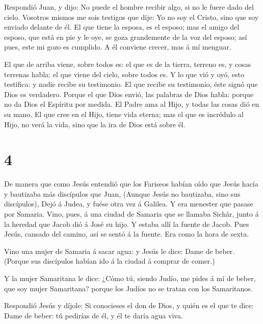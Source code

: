  Respondió Juan, y dijo: No puede el hombre recibir algo,
si no le fuere dado del cielo.  Vosotros mismos me sois
testigos que dije: Yo no soy el Cristo, sino que soy enviado delante de
él.  El que tiene la esposa, es el esposo; mas el amigo del
esposo, que está en pie y le oye, se goza grandemente de la voz del
esposo; así pues, este mi gozo es cumplido.  A él conviene
crecer, mas á mí menguar.

 El que de arriba viene, sobre todos es: el que es de la
tierra, terreno es, y cosas terrenas habla: el que viene del cielo,
sobre todos es.  Y lo que vió y oyó, esto testifica: y
nadie recibe su testimonio.  El que recibe su testimonio,
éste signó que Dios es verdadero.  Porque el que Dios
envió, las palabras de Dios habla: porque no da Dios el Espíritu por
medida.  El Padre ama al Hijo, y todas las cosas dió en su
mano.  El que cree en el Hijo, tiene vida eterna; mas el
que es incrédulo al Hijo, no verá la vida, sino que la ira de Dios está
sobre él.

\hypertarget{section-3}{%
\section{4}\label{section-3}}

 De manera que como Jesús entendió que los Fariseos habían
oído que Jesús hacía y bautizaba más discípulos que Juan, 
(Aunque Jesús no bautizaba, sino sus discípulos),  Dejó á
Judea, y fuése otra vez á Galilea.  Y era menester que
pasase por Samaria.  Vino, pues, á una ciudad de Samaria que
se llamaba Sichâr, junto á la heredad que Jacob dió á José su hijo.
 Y estaba allí la fuente de Jacob. Pues Jesús, cansado del
camino, así se sentó á la fuente. Era como la hora de sexta.

 Vino una mujer de Samaria á sacar agua: y Jesús le dice:
Dame de beber.  (Porque sus discípulos habían ido á la
ciudad á comprar de comer.)

 Y la mujer Samaritana le dice: ¿Cómo tú, siendo Judío, me
pides á mí de beber, que soy mujer Samaritana? porque los Judíos no se
tratan con los Samaritanos.

 Respondió Jesús y díjole: Si conocieses el don de Dios, y
quién es el que te dice: Dame de beber: tú pedirías de él, y él te daría
agua viva.

